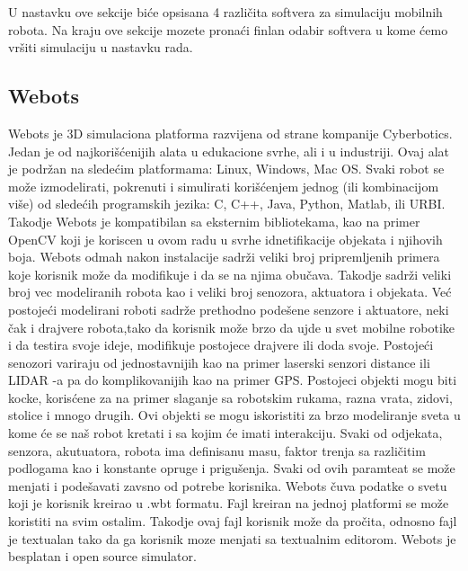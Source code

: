 U nastavku ove sekcije biće opsisana 4 različita softvera za simulaciju
mobilnih robota. Na kraju ove sekcije mozete pronaći finlan odabir softvera
u kome ćemo vršiti simulaciju u nastavku rada.
\subsection{Webots}
Webots je 3D simulaciona platforma razvijena od strane kompanije Cyberbotics.
Jedan je od najkorišćenijih alata u edukacione svrhe, ali i u industriji.
Ovaj alat je podržan na sledećim platformama: Linux, Windows, Mac OS.
Svaki robot se može izmodelirati, pokrenuti i simulirati korišćenjem jednog
(ili kombinacijom više) od sledećih programskih jezika: C, C++, Java, Python, Matlab, ili URBI.\cite{webots-vs-gazebo-2}
Takodje Webots je kompatibilan sa eksternim bibliotekama, kao na primer OpenCV koji je
koriscen u ovom radu u svrhe idnetifikacije objekata i njihovih boja.
Webots odmah nakon instalacije sadrži veliki broj pripremljenih primera koje korisnik
može da modifikuje i da se na njima obučava. Takodje sadrži veliki broj vec modeliranih
robota kao i veliki broj senozora, aktuatora i objekata.
Već postojeći modelirani roboti sadrže prethodno podešene senzore i aktuatore,
neki čak i drajvere robota,tako da korisnik može brzo da ujde u svet mobilne
robotike i da testira svoje ideje, modifikuje postojece drajvere ili doda svoje.
Postojeći senozori variraju od jednostavnijih kao na primer laserski
senzori distance ili LIDAR -a pa do komplikovanijih kao na primer GPS.
Postojeci objekti mogu biti kocke, korisćene za na primer slaganje sa robotskim
rukama, razna vrata, zidovi, stolice i mnogo drugih.
Ovi objekti se mogu iskoristiti za brzo modeliranje sveta u kome će se naš robot
kretati i sa kojim će imati interakciju.
\newline
Svaki od odjekata, senzora, akutuatora, robota ima definisanu masu, faktor trenja sa
različitim podlogama kao i konstante opruge i prigušenja.
Svaki od ovih paramteat se može menjati i podešavati zavsno od potrebe korisnika.
\newline
Webots čuva podatke o svetu koji je korisnik kreirao u .wbt formatu. Fajl kreiran na jednoj
platformi se može koristiti na svim ostalim. Takodje ovaj fajl korisnik može da pročita,
odnosno fajl je textualan tako da ga korisnik moze menjati sa textualnim editorom.
\newline
Webots je besplatan i open source simulator.

